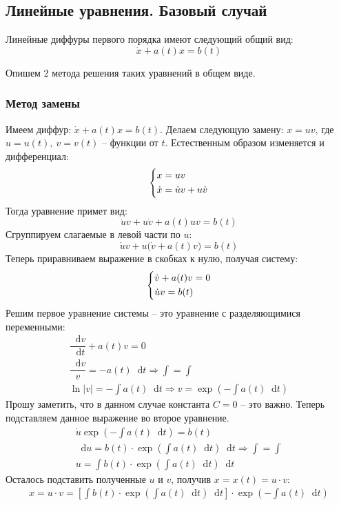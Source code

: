 \documentclass[a4paper,12pt]{article}
\renewcommand*\d{\mathop{}\!\mathrm{d}}
\newcommand{\du}{\dot{u}}
\renewcommand{\dv}{\dot{v}}
\newcommand{\dx}{\dot{x}}
\newcommand{\ds}{\displaystyle}
\begin{document}
\subsection{Линейные уравнения. Базовый случай}

Линейные диффуры первого порядка имеют следующий общий вид: \[\dx + a(t)x = b(t)\]

Опишем 2 метода решения таких уравнений в общем виде.

\subsubsection{Метод замены}

Имеем диффур: $\dx + a(t)x = b(t)$. Делаем следующую замену: $x = uv$, где $u = u(t),\ v = v(t)$ -- функции от $t$. Естественным образом изменяется и дифференциал:
\[\left\{\begin{gathered}
x = uv\hfill\\
\dx = \du v + u\dv\hfill
\end{gathered}\right.\]
Тогда уравнение примет вид:
\[\du v + u\dv + a(t)uv = b(t)\]
Сгруппируем слагаемые в левой части по $u$:
\[\du v + u\big(\dv + a(t)v\big) = b(t)\]
Теперь приравниваем выражение в скобках к нулю, получая систему:
\[\left\{\begin{gathered}
\dv + a(t)v = 0\hfill\\
\du v = b(t)\hfill
\end{gathered}\right.\]
Решим первое уравнение системы -- это уравнение с разделяющимися переменными:
\begin{gather*}
\dfrac{\d v}{\d t} + a(t)v = 0\\
\dfrac{\d v}{v} = -a(t)\d t \Longrightarrow \ds\int = \int\\
\ln|v| = -\ds\int a(t) \d t \Longrightarrow v = \exp(-\ds\int a(t)\d t)
\end{gather*}
Прошу заметить, что в данном случае константа $C = 0$ -- это важно. Теперь подставляем данное выражение во второе уравнение.
\begin{gather*}
\du\exp(-\ds\int a(t)\d t) = b(t)\\
\d u = b(t) \cdot \exp(\ds\int a(t)\d t)\d t \Longrightarrow \ds\int = \int\\
u = \ds\int b(t) \cdot \exp(\ds\int a(t) \d t)\d t
\end{gather*}
Осталось подставить полученные $u$ и $v$, получив $x = x(t) = u \cdot v$:
\begin{gather*}
x = u \cdot v = \left[\ds\int b(t) \cdot \exp(\ds\int a(t) \d t)\d t\right] \cdot \exp(-\ds\int a(t) \d t)
\end{gather*}
\ \\
\end{document}
